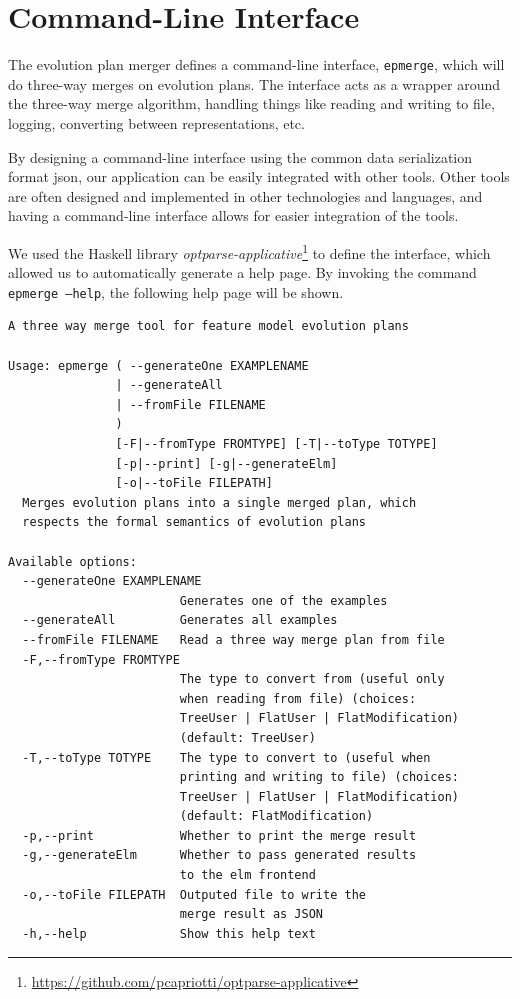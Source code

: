 \documentclass[a4paper,english]{ifimaster}
\begin{document}
\section{Command-Line Interface}%
\label{sec:command_line_interface}

The evolution plan merger defines a command-line interface, \texttt{epmerge}, which will do three-way merges on evolution plans. The interface acts as a wrapper around the three-way merge algorithm, handling things like reading and writing to file, logging, converting between representations, etc. 

By designing a command-line interface using the common data serialization format json, our application can be easily integrated with other tools. Other tools are often designed and implemented in other technologies and languages, and having a command-line interface allows for easier integration of the tools.

We used the Haskell library \textit{optparse-applicative}\footnote{\url{https://github.com/pcapriotti/optparse-applicative}} to define the interface, which allowed us to automatically generate a help page. By invoking the command \texttt{epmerge --help}, the following help page will be shown.

\begin{verbatim}
A three way merge tool for feature model evolution plans

Usage: epmerge ( --generateOne EXAMPLENAME 
               | --generateAll 
               | --fromFile FILENAME
               )
               [-F|--fromType FROMTYPE] [-T|--toType TOTYPE] 
               [-p|--print] [-g|--generateElm] 
               [-o|--toFile FILEPATH]
  Merges evolution plans into a single merged plan, which 
  respects the formal semantics of evolution plans

Available options:
  --generateOne EXAMPLENAME
                        Generates one of the examples
  --generateAll         Generates all examples
  --fromFile FILENAME   Read a three way merge plan from file
  -F,--fromType FROMTYPE   
                        The type to convert from (useful only 
                        when reading from file) (choices: 
                        TreeUser | FlatUser | FlatModification) 
                        (default: TreeUser)
  -T,--toType TOTYPE    The type to convert to (useful when 
                        printing and writing to file) (choices: 
                        TreeUser | FlatUser | FlatModification) 
                        (default: FlatModification)
  -p,--print            Whether to print the merge result
  -g,--generateElm      Whether to pass generated results 
                        to the elm frontend
  -o,--toFile FILEPATH  Outputed file to write the 
                        merge result as JSON
  -h,--help             Show this help text
\end{verbatim}
\end{document}
